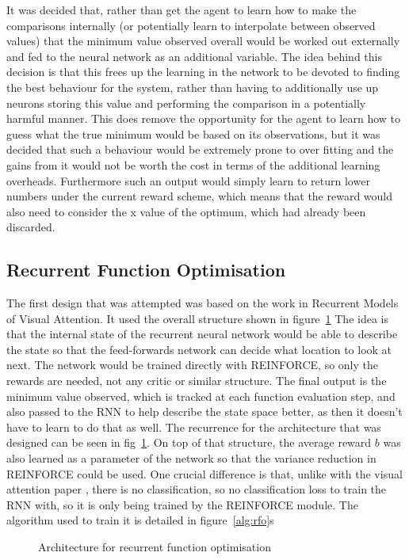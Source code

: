 It was decided that, rather than get the agent to learn how to make the comparisons internally (or potentially learn to interpolate between observed values) that the minimum value observed overall would be worked out externally and fed to the neural network as an additional variable. The idea behind this decision is that this frees up the learning in the network to be devoted to finding the best behaviour for the system, rather than having to additionally use up neurons storing this value and performing the comparison in a potentially harmful manner. This does remove the opportunity for the agent to learn how to guess what the true minimum would be based on its observations, but it was decided that such a behaviour would be extremely prone to over fitting and the gains from it would not be worth the cost in terms of the additional learning overheads. Furthermore such an output would simply learn to return lower numbers under the current reward scheme, which means that the reward would also need to consider the x value of the optimum, which had already been discarded.

\subsection{Recurrent Function Optimisation}
The first design that was attempted was based on the work in Recurrent Models of Visual Attention\cite{RVA}. It used the overall structure shown in figure~\ref{fig:RFOarch} The idea is that the internal state of the recurrent neural network would be able to describe the state so that the feed-forwards network can decide what location to look at next. The network would be trained directly with REINFORCE, so only the rewards are needed, not any critic or similar structure. The final output is the minimum value observed, which is tracked at each function evaluation step, and also passed to the RNN to help describe the state space better, as then it doesn't have to learn to do that as well. The recurrence for the architecture that was designed can be seen in fig~\ref{fig:RFOarch}. On top of that structure, the average reward $b$ was also learned as a parameter of the network so that the variance reduction in REINFORCE could be used. One crucial difference is that, unlike with the visual attention paper \cite{RVA}, there is no classification, so no classification loss to train the RNN with, so it is only being trained by the REINFORCE module. The algorithm used to train it is detailed in figure~\ref{alg:rfo}s

\begin{figure}
\centering

\caption{Architecture for recurrent function optimisation}
\label{fig:RFOarch}
\end{figure}

